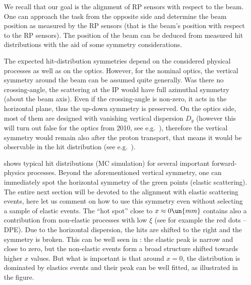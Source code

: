 We recall that our goal is the alignment of RP sensors with respect to the beam. One can approach the task from the opposite side and determine the beam position as measured by the RP sensors (that is the beam's position with respect to the RP sensors). The position of the beam can be deduced from measured hit distributions with the aid of some symmetry considerations.


\iffalse
\> beam position is the theoretical hit position of an elastic proton with $\th = 0$ and the mean vertex position.
\> (in our OfflineSW convention, the beam is at zero)
\> misalignements $\De q$ and RP positions $q^{\rm RP}$ (in accordance with \Eq{misalignment definition})
$$q^{\rm RP}(\hbox{actual/misaligned}) = q^{\rm RP}(\hbox{thought/nominal}) + \De q$$
therefore for hit positions $q$
$$q(\hbox{reconstructed with thought geometry}) = q(\hbox{real}) - \De q$$
\fi

The expected hit-distribution symmetries depend on the considered physical processes as well as on the optics. However, for the nominal optics, the vertical symmetry around the beam can be assumed quite generally. Was there no crossing-angle, the scattering at the IP would have full azimuthal symmetry (about the beam axis). Even if the crossing-angle is non-zero, it acts in the horizontal plane, thus the up-down symmetry is preserved. On the optics side, most of them are designed with vanishing vertical dispersion $D_y$ (however this will turn out false for the optics from 2010, see e.g.~), therefore the vertical symmetry would remain also after the proton transport, that means it would be observable in the hit distribution (see e.g.~).


 shows typical hit distributions (MC simulation) for several important forward-physics processes. Beyond the aforementioned vertical symmetry, one can immediately spot the horizontal symmetry of the green points (elastic scattering). The entire next section  will be devoted to the alignment with elastic scattering events, here let us comment on how to use this symmetry even without selecting a sample of elastic events. The ``hot spot'' close to $x\approx 0\un{mm}$ contains also a contribution from non-elastic processes with low $\xi$ (see for example the red dots -- DPE). Due to the horizontal dispersion, the hits are shifted to the right and the symmetry is broken. This can be well seen in : the elastic peak is narrow and close to zero, but the non-elastic events form a broad structure shifted towards higher $x$ values. But what is important is that around $x=0$, the distribution is dominated by elastics events and their peak can be well fitted, as illustrated in the figure.

